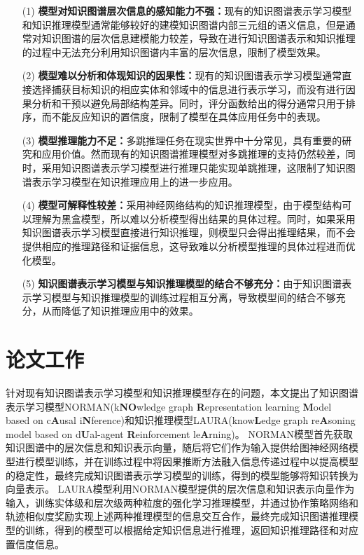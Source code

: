 \documentclass[algorithmlist, AutoFakeBold, AutoFakeSlant, figurelist, tablelist, nomlist, masters]{seuthesix}
\begin{document}
\begin{itemize}
  \item [(1)]\textbf{模型对知识图谱层次信息的感知能力不强：}现有的知识图谱表示学习模型和知识推理模型通常能够较好的建模知识图谱内部三元组的语义信息，但是通常对知识图谱的层次信息建模能力较差，导致在进行知识图谱表示和知识推理的过程中无法充分利用知识图谱内丰富的层次信息，限制了模型效果。
  \item [(2)]\textbf{模型难以分析和体现知识的因果性：}现有的知识图谱表示学习模型通常直接选择捕获目标知识的相应实体和邻域中的信息进行表示学习，而没有进行因果分析和干预以避免局部结构差异。同时，评分函数给出的得分通常只用于排序，而不能反应知识的置信度，限制了模型在具体应用任务中的表现。
  \item [(3)]\textbf{模型推理能力不足：}多跳推理任务在现实世界中十分常见，具有重要的研究和应用价值。然而现有的知识图谱推理模型对多跳推理的支持仍然较差，同时，采用知识图谱表示学习模型进行推理只能实现单跳推理，这限制了知识图谱表示学习模型在知识推理应用上的进一步应用。
  \item [(4)]\textbf{模型可解释性较差：}采用神经网络结构的知识推理模型，由于模型结构可以理解为黑盒模型，所以难以分析模型得出结果的具体过程。同时，如果采用知识图谱表示学习模型直接进行知识推理，则模型只会得出推理结果，而不会提供相应的推理路径和证据信息，这导致难以分析模型推理的具体过程进而优化模型。
  \item [(5)]\textbf{知识图谱表示学习模型与知识推理模型的结合不够充分：}由于知识图谱表示学习模型与知识推理模型的训练过程相互分离，导致模型间的结合不够充分，从而降低了知识推理应用中的效果。
\end{itemize}

\section{论文工作}
针对现有知识图谱表示学习模型和知识推理模型存在的问题，本文提出了知识图谱表示学习模型NORMAN(k\textbf{NO}wledge graph \textbf{R}epresentation learning \textbf{M}odel based on c\textbf{A}usal i\textbf{N}ference)和知识推理模型LAURA(know\textbf{L}edge graph re\textbf{A}soning model based on d\textbf{U}al-agent \textbf{R}einforcement le\textbf{A}rning)。
NORMAN模型首先获取知识图谱中的层次信息和知识表示向量，随后将它们作为输入提供给图神经网络模型进行模型训练，并在训练过程中将因果推断方法融入信息传递过程中以提高模型的稳定性，最终完成知识图谱表示学习模型的训练，得到的模型能够将知识转换为向量表示。
LAURA模型利用NORMAN模型提供的层次信息和知识表示向量作为输入，训练实体级和层次级两种粒度的强化学习推理模型，并通过协作策略网络和轨迹相似度奖励实现上述两种推理模型的信息交互合作，最终完成知识图谱推理模型的训练，得到的模型可以根据给定知识信息进行推理，返回知识推理路径和对应置信度信息。
\end{document}
